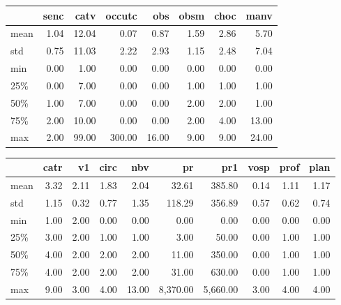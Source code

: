 \documentclass[a4paper]{article}
\theoremstyle{definition}
\theoremstyle{proposition}
\begin{document}
\begin{tabular}{lrrrrrrr}
\toprule
{} &       senc &       catv &     occutc &        obs &       obsm &       choc &       manv \\
\midrule
mean  &       1.04 &      12.04 &       0.07 &       0.87 &       1.59 &       2.86 &       5.70 \\
std   &       0.75 &      11.03 &       2.22 &       2.93 &       1.15 &       2.48 &       7.04 \\
min   &       0.00 &       1.00 &       0.00 &       0.00 &       0.00 &       0.00 &       0.00 \\
25\%   &       0.00 &       7.00 &       0.00 &       0.00 &       1.00 &       1.00 &       1.00 \\
50\%   &       1.00 &       7.00 &       0.00 &       0.00 &       2.00 &       2.00 &       1.00 \\
75\%   &       2.00 &      10.00 &       0.00 &       0.00 &       2.00 &       4.00 &      13.00 \\
max   &       2.00 &      99.00 &     300.00 &      16.00 &       9.00 &       9.00 &      24.00 \\
\bottomrule
\end{tabular}

\vspace{0.5cm}


\begin{tabular}{lrrrrrrrrr}
\toprule
{} &      catr &     v1 &      circ &       nbv &        pr &       pr1 &      vosp &      prof &      plan \\
\midrule
mean  &      3.32 &   2.11 &      1.83 &      2.04 &     32.61 &    385.80 &      0.14 &      1.11 &      1.17 \\
std   &      1.15 &   0.32 &      0.77 &      1.35 &    118.29 &    356.89 &      0.57 &      0.62 &      0.74 \\
min   &      1.00 &   2.00 &      0.00 &      0.00 &      0.00 &      0.00 &      0.00 &      0.00 &      0.00 \\
25\%   &      3.00 &   2.00 &      1.00 &      1.00 &      3.00 &     50.00 &      0.00 &      1.00 &      1.00 \\
50\%   &      4.00 &   2.00 &      2.00 &      2.00 &     11.00 &    350.00 &      0.00 &      1.00 &      1.00 \\
75\%   &      4.00 &   2.00 &      2.00 &      2.00 &     31.00 &    630.00 &      0.00 &      1.00 &      1.00 \\
max   &      9.00 &   3.00 &      4.00 &     13.00 &  8,370.00 &  5,660.00 &      3.00 &      4.00 &      4.00 \\
\bottomrule
\end{tabular}
\end{document}
